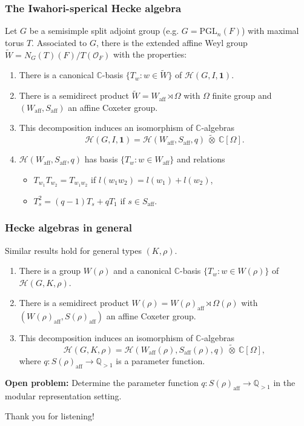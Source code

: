 \documentclass{beamer}
\newcommand{\PGL}{\mathrm{PGL}}
\newcommand{\aff}{\mathrm{aff}}
\newcommand{\CC}{\mathbb{C}}
\newcommand{\QQ}{\mathbb{Q}}
\newcommand{\cH}{\mathcal{H}}
\theoremstyle{plain}
\begin{document}
\begin{frame}
    \frametitle{The Iwahori-sperical Hecke algebra}
    Let $G$ be a semisimple split adjoint group (e.g. $G=\PGL_n(F)$) with maximal torus $T$. Associated to $G$, there is the extended affine Weyl group $\widetilde{W}=N_G(T)(F)/T(\mathcal{O}_F)$ with the properties:
    \begin{enumerate}
        \item There is a canonical $\CC$-basis $\{T_w:w\in\widetilde{W}\}$ of $\cH(G,I,\mathbf{1})$.
        \item There is a semidirect product $\widetilde{W}=W_{\aff}\rtimes\Omega$ with $\Omega$ finite group and $(W_{\aff},S_{\aff})$ an affine Coxeter group.
        \item This decomposition induces an isomorphism of $\CC$-algebras
        \[\cH(G,I,\mathbf{1})=\cH(W_{\aff},S_{\aff},q)\ \tilde{\otimes}\ \CC[\Omega].\]
        \item $\cH(W_{\aff},S_{\aff},q)$ has basis $\{T_w:w\in W_{\aff}\}$ and relations
        \begin{itemize}
            \item $T_{w_1}T_{w_2}=T_{w_1w_2}$ if $l(w_1w_2)=l(w_1)+l(w_2)$,
            \item $T_s^2=(q-1)T_s+qT_1$ if $s\in S_{\aff}$.
        \end{itemize}
    \end{enumerate}
\end{frame}

\begin{frame}
    \frametitle{Hecke algebras in general}
    Similar results hold for general types $(K,\rho)$. 
    \begin{enumerate}
        \item There is a group $W(\rho)$ and a canonical $\CC$-basis $\{T_w:w\in W(\rho)\}$ of $\cH(G,K,\rho)$.
        \item There is a semidirect product $W(\rho)=W(\rho)_{\aff}\rtimes\Omega(\rho)$ with $(W(\rho)_{\aff},S(\rho)_{\aff})$ an affine Coxeter group.
        \item This decomposition induces an isomorphism of $\CC$-algebras
        \[\cH(G,K,\rho)=\cH(W_{\aff}(\rho),S_{\aff}(\rho),q)\ \tilde{\otimes}\ \CC[\Omega],\]
        where $q:S(\rho)_{\aff}\rightarrow\QQ_{>1}$ is a parameter function.
    \end{enumerate}
    \vspace{0.3cm}
    \textbf{Open problem:} Determine the parameter function $q:S(\rho)_{\aff}\rightarrow\QQ_{>1}$ in the modular representation setting. 
\end{frame}



\begin{frame}
    Thank you for listening!
\end{frame}
\end{document}
